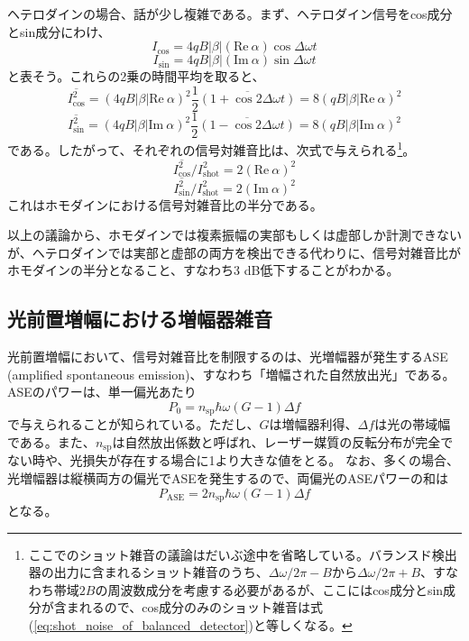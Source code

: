 ヘテロダインの場合、話が少し複雑である。まず、ヘテロダイン信号をcos成分とsin成分にわけ、
\begin{equation}
  I_\mathrm{cos} = 4qB|\beta|(\mathrm{Re} \ \alpha) \cos\Delta\omega t
\end{equation}
\begin{equation}
  I_\mathrm{sin} = 4qB|\beta|(\mathrm{Im} \ \alpha) \sin\Delta\omega t
\end{equation}
と表そう。これらの2乗の時間平均を取ると、
\begin{equation}
  \overline{I_\mathrm{cos}^2} = (4qB|\beta|\mathrm{Re} \ \alpha)^2 \frac{1}{2}\overline{(1+\cos 2\Delta \omega t)} = 8(qB|\beta|\mathrm{Re} \ \alpha)^2
\end{equation}
\begin{equation}
  \overline{I_\mathrm{sin}^2} = (4qB|\beta|\mathrm{Im} \ \alpha)^2 \frac{1}{2}\overline{(1-\cos 2\Delta \omega t)} = 8(qB|\beta|\mathrm{Im} \ \alpha)^2
\end{equation}
である。したがって、それぞれの信号対雑音比は、次式で与えられる\footnote{ここでのショット雑音の議論はだいぶ途中を省略している。バランスド検出器の出力に含まれるショット雑音のうち、$\Delta \omega/2\pi - B$から$\Delta \omega/2\pi + B$、すなわち帯域$2B$の周波数成分を考慮する必要があるが、ここにはcos成分とsin成分が含まれるので、cos成分のみのショット雑音は式(\ref{eq:shot_noise_of_balanced_detector})と等しくなる。}。
\begin{equation}
  \overline{I_\mathrm{cos}^2}/I_\mathrm{shot}^2 = 2(\mathrm{Re} \ \alpha)^2
\end{equation}
\begin{equation}
  \overline{I_\mathrm{sin}^2}/I_\mathrm{shot}^2 = 2(\mathrm{Im} \ \alpha)^2
\end{equation}
これはホモダインにおける信号対雑音比の半分である。

以上の議論から、ホモダインでは複素振幅の実部もしくは虚部しか計測できないが、ヘテロダインでは実部と虚部の両方を検出できる代わりに、信号対雑音比がホモダインの半分となること、すなわち3 dB低下することがわかる。

\subsection{光前置増幅における増幅器雑音}

光前置増幅において、信号対雑音比を制限するのは、光増幅器が発生するASE (amplified spontaneous emission)、すなわち「増幅された自然放出光」である。ASEのパワーは、単一偏光あたり
\begin{equation}
	P_0 = n_\mathrm{sp}\hbar \omega (G-1)\Delta f
\end{equation}
で与えられることが知られている。ただし、$G$は増幅器利得、$\Delta f$は光の帯域幅である。また、$n_\mathrm{sp}$は自然放出係数と呼ばれ、レーザー媒質の反転分布が完全でない時や、光損失が存在する場合に1より大きな値をとる。
なお、多くの場合、光増幅器は縦横両方の偏光でASEを発生するので、両偏光のASEパワーの和は
\begin{equation}
	P_\mathrm{ASE} = 2n_\mathrm{sp}\hbar \omega (G-1)\Delta f
\label{eq:ASE_power}
\end{equation}
となる。

